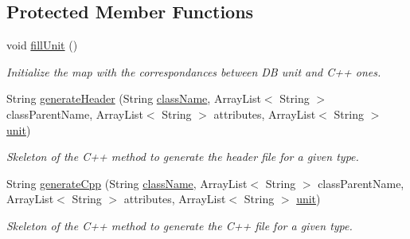 \subsection*{Protected Member Functions}
\begin{DoxyCompactItemize}
\item 
\hypertarget{class_classes_c_p_p_1_1_class_generator_a655b5c5524af7fde5afe146dcad327fd}{
void \hyperlink{class_classes_c_p_p_1_1_class_generator_a655b5c5524af7fde5afe146dcad327fd}{fillUnit} ()}
\label{class_classes_c_p_p_1_1_class_generator_a655b5c5524af7fde5afe146dcad327fd}

\begin{DoxyCompactList}\small\item\em Initialize the map with the correspondances between DB unit and C++ ones. \end{DoxyCompactList}\item 
String \hyperlink{class_classes_c_p_p_1_1_class_generator_a7536fe332f0ad4b4a2c2e88afcb481c9}{generateHeader} (String \hyperlink{class_classes_c_p_p_1_1_class_generator_afdefd7e06ee9c818e2d3d367bed59bc1}{className}, ArrayList$<$ String $>$ classParentName, ArrayList$<$ String $>$ attributes, ArrayList$<$ String $>$ \hyperlink{class_classes_c_p_p_1_1_class_generator_ae42121bfdd264575455ea05f08180020}{unit})
\begin{DoxyCompactList}\small\item\em Skeleton of the C++ method to generate the header file for a given type. \end{DoxyCompactList}\item 
String \hyperlink{class_classes_c_p_p_1_1_class_generator_a2b803f00feba61f46791357d5f255502}{generateCpp} (String \hyperlink{class_classes_c_p_p_1_1_class_generator_afdefd7e06ee9c818e2d3d367bed59bc1}{className}, ArrayList$<$ String $>$ classParentName, ArrayList$<$ String $>$ attributes, ArrayList$<$ String $>$ \hyperlink{class_classes_c_p_p_1_1_class_generator_ae42121bfdd264575455ea05f08180020}{unit})
\begin{DoxyCompactList}\small\item\em Skeleton of the C++ method to generate the C++ file for a given type. \end{DoxyCompactList}\end{DoxyCompactItemize}
